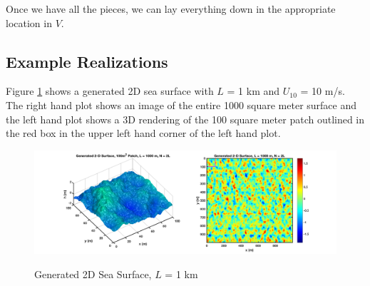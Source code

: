 Once we have all the pieces, we can lay everything down in the appropriate location in $V$.

\subsection{Example Realizations}
Figure \ref{os_fig:8} shows a generated 2D sea surface with $L$ = 1 km and $U_{10}$ = 10 m/s. The right hand plot shows an image of the entire 1000 square meter surface and the left hand plot shows a 3D rendering of the 100 square meter patch outlined in the red box in the upper left hand corner of the left hand plot.
\begin{figure}[H]
  \begin{center}
\includegraphics[width=6in]{../media/Ocean_Surface/sea_surface_2d_surf.png}
  \end{center}
  \renewcommand{\baselinestretch}{1} \small\normalsize
  \begin{quote}
    \caption[Generated 2D Sea Surface, $L$ = 1 km]{Generated 2D Sea Surface, $L$ = 1 km \label{os_fig:8}}
  \end{quote}
\end{figure}
\renewcommand{\baselinestretch}{2} \small\normalsize

